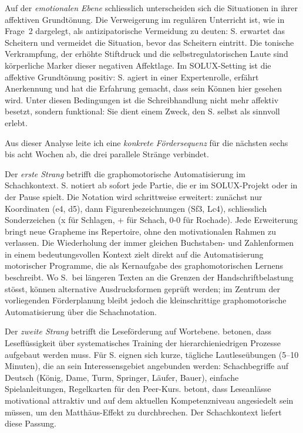 \documentclass[ngerman, a4paper]{article}
\begin{document}
Auf der \textit{emotionalen Ebene} schliesslich unterscheiden sich die Situationen
in ihrer affektiven Grundtönung. Die Verweigerung im regulären Unterricht ist,
wie in Frage~2 dargelegt, als antizipatorische Vermeidung zu deuten: S. erwartet
das Scheitern und vermeidet die Situation, bevor das Scheitern eintritt. Die
tonische Verkrampfung, der erhöhte Stiftdruck und die selbstregulatorischen Laute
sind körperliche Marker dieser negativen Affektlage. Im SOLUX-Setting ist die
affektive Grundtönung positiv: S. agiert in einer Expertenrolle, erfährt
Anerkennung und hat die Erfahrung gemacht, dass sein Können hier gesehen wird.
Unter diesen Bedingungen ist die Schreibhandlung nicht mehr affektiv besetzt,
sondern funktional: Sie dient einem Zweck, den S. selbst als sinnvoll erlebt.

Aus dieser Analyse leite ich eine \textit{konkrete Fördersequenz} für die nächsten
sechs bis acht Wochen ab, die drei parallele Stränge verbindet.

Der \textit{erste Strang} betrifft die graphomotorische Automatisierung im
Schachkontext. S. notiert ab sofort jede Partie, die er im SOLUX-Projekt oder
in der Pause spielt. Die Notation wird schrittweise erweitert: zunächst nur
Koordinaten (e4, d5), dann Figurenbezeichnungen (Sf3, Lc4), schliesslich
Sonderzeichen (x für Schlagen, + für Schach, 0-0 für Rochade). Jede Erweiterung
bringt neue Grapheme ins Repertoire, ohne den motivationalen Rahmen zu verlassen.
Die Wiederholung der immer gleichen Buchstaben- und Zahlenformen in einem
bedeutungsvollen Kontext zielt direkt auf die Automatisierung motorischer
Programme, die \textcite[S.\,1--4]{sturm2016graphomotorik} als Kernaufgabe des graphomotorischen Lernens beschreibt.
Wo S.\ bei längeren Texten an die Grenzen
der Handschriftbelastung stösst, können alternative Ausdrucksformen geprüft
werden; im Zentrum der vorliegenden Förderplanung bleibt jedoch die
kleinschrittige graphomotorische Automatisierung über die Schachnotation.

Der \textit{zweite Strang} betrifft die Leseförderung auf Wortebene. \textcite[Kap.\,1--4]{rosebrock2010grundlagen}
betonen, dass Leseflüssigkeit über systematisches Training der
hierarchieniedrigen Prozesse aufgebaut werden muss.
Für S. eignen sich kurze, tägliche
Lautleseübungen (5--10 Minuten), die an sein Interessensgebiet angebunden werden:
Schachbegriffe auf Deutsch (König, Dame, Turm, Springer, Läufer, Bauer),
einfache Spielanleitungen, Regelkarten für den Peer-Kurs. \textcite[Kap.\,1--4]{gold2018lesenkannmanlernen} betont, dass
Leseanlässe motivational attraktiv und auf dem aktuellen Kompetenzniveau
angesiedelt sein müssen, um den Matthäus-Effekt zu durchbrechen. Der Schachkontext liefert diese Passung.
\end{document}
